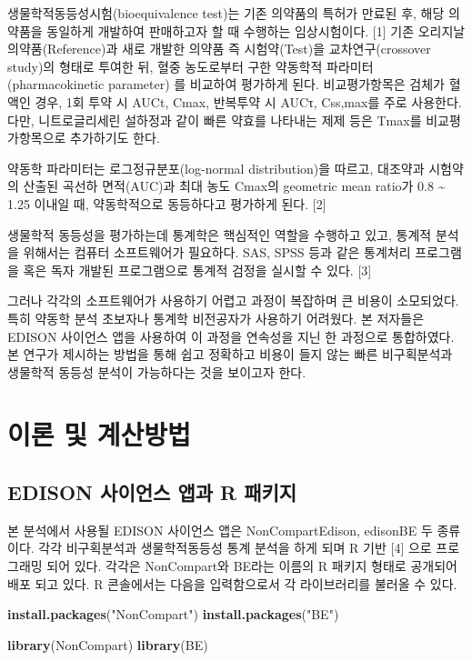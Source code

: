\documentclass[12pt,]{krantz}
\newenvironment{Shaded}{\begin{snugshade}}{\end{snugshade}}
\newcommand{\KeywordTok}[1]{\textcolor[rgb]{0.13,0.29,0.53}{\textbf{#1}}}
\newcommand{\NormalTok}[1]{#1}
\newcommand{\StringTok}[1]{\textcolor[rgb]{0.31,0.60,0.02}{#1}}
\begin{document}
생물학적동등성시험(bioequivalence test)는 기존 의약품의 특허가 만료된 후, 해당 의약품을 동일하게 개발하여 판매하고자 할 때 수행하는 임상시험이다. {[}1{]} 기존 오리지날 의약품(Reference)과 새로 개발한 의약품 즉 시험약(Test)을 교차연구(crossover study)의 형태로 투여한 뒤, 혈중 농도로부터 구한 약동학적 파라미터(pharmacokinetic parameter) 를 비교하여 평가하게 된다. 비교평가항목은 검체가 혈액인 경우, 1회 투약 시 AUCt, Cmax, 반복투약 시 AUCτ, Css,max를 주로 사용한다. 다만, 니트로글리세린 설하정과 같이 빠른 약효를 나타내는 제제 등은 Tmax를 비교평가항목으로 추가하기도 한다.

약동학 파라미터는 로그정규분포(log-normal distribution)을 따르고, 대조약과 시험약의 산출된 곡선하 면적(AUC)과 최대 농도 Cmax의 geometric mean ratio가 0.8 \textasciitilde{} 1.25 이내일 때, 약동학적으로 동등하다고 평가하게 된다. {[}2{]}

생물학적 동등성을 평가하는데 통계학은 핵심적인 역할을 수행하고 있고, 통계적 분석을 위해서는 컴퓨터 소프트웨어가 필요하다. SAS, SPSS 등과 같은 통계처리 프로그램을 혹은 독자 개발된 프로그램으로 통계적 검정을 실시할 수 있다. {[}3{]}

그러나 각각의 소프트웨어가 사용하기 어렵고 과정이 복잡하며 큰 비용이 소모되었다. 특히 약동학 분석 초보자나 통계학 비전공자가 사용하기 어려웠다. 본 저자들은 EDISON 사이언스 앱을 사용하여 이 과정을 연속성을 지닌 한 과정으로 통합하였다. 본 연구가 제시하는 방법을 통해 쉽고 정확하고 비용이 들지 않는 빠른 비구획분석과 생물학적 동등성 분석이 가능하다는 것을 보이고자 한다.

\hypertarget{method}{%
\chapter{이론 및 계산방법}\label{method}}

\hypertarget{edison---r-}{%
\section{EDISON 사이언스 앱과 R 패키지}\label{edison---r-}}

본 분석에서 사용될 EDISON 사이언스 앱은 NonCompartEdison, edisonBE 두 종류이다. 각각 비구획분석과 생물학적동등성 통계 분석을 하게 되며 R 기반 {[}4{]} 으로 프로그래밍 되어 있다. 각각은 NonCompart와 BE라는 이름의 R 패키지 형태로 공개되어 배포 되고 있다. R 콘솔에서는 다음을 입력함으로서 각 라이브러리를 불러올 수 있다.

\begin{Shaded}
\begin{Highlighting}[]
\KeywordTok{install.packages}\NormalTok{(}\StringTok{"NonCompart"}\NormalTok{)}
\KeywordTok{install.packages}\NormalTok{(}\StringTok{"BE"}\NormalTok{)}

\KeywordTok{library}\NormalTok{(NonCompart)}
\KeywordTok{library}\NormalTok{(BE)}
\end{Highlighting}
\end{Shaded}
\end{document}
